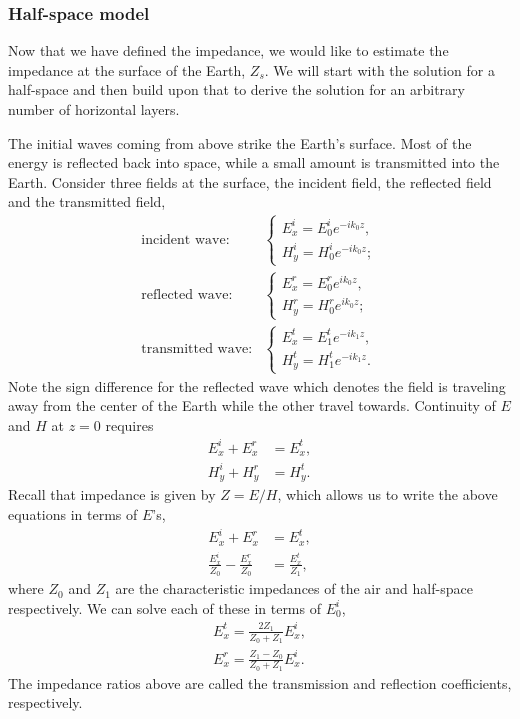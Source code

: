 \subsubsection{Half-space model}
Now that we have defined the impedance, we would like to estimate the impedance
at the surface of the Earth, $Z_s$.  We will start with the solution for a
half-space and then build upon that to derive the solution for an arbitrary
number of horizontal layers.

The initial waves coming from above strike the Earth's surface.  Most of the
energy is reflected back into space, while a small amount is transmitted into
the Earth.  Consider three fields at the surface, the incident field, the
reflected field and the transmitted field,
\begin{align}
    \text{incident wave:} &
    \begin{cases}
        E^i_x = E^i_0 e^{-i k_0 z}, \\
        H^i_y = H^i_0 e^{-i k_0 z};
    \end{cases} \\
    \text{reflected wave:} &
    \begin{cases}
        E^r_x = E^r_0 e^{i k_0 z}, \\
        H^r_y = H^r_0 e^{i k_0 z};
    \end{cases} \\
    \text{transmitted wave:} &
    \begin{cases}
        E^t_x = E^t_1 e^{-i k_1 z}, \\
        H^t_y = H^t_1 e^{-i k_1 z}.
    \end{cases}
    \label{eq-sfield}
\end{align}
Note the sign difference for the reflected wave which denotes the field is
traveling away from the center of the Earth while the other travel towards.
Continuity of $E$ and $H$ at $z = 0$ requires
\begin{align*}
    E^i_x + E^r_x & = E^t_x, \\
    H^i_y + H^r_y & = H^t_y.
\end{align*}
Recall that impedance is given by $Z = E/H$, which allows us to write
the above equations in terms of $E$'s,
\begin{align*}
    E^i_x + E^r_x & = E^t_x, \\
    \frac{E^i_x}{Z_0} - \frac{E^r_x}{Z_0} & = \frac{E^t_x}{Z_1},
\end{align*}
where $Z_0$ and $Z_1$ are the characteristic impedances of the air and
half-space respectively.  We can solve each of these in terms of $E^i_0$,
\begin{align*}
    E^t_x = \frac{2 Z_1}{Z_0 + Z_1} E^i_x, \\
    E^r_x = \frac{Z_1 - Z_0}{Z_0 + Z_1} E^i_x.
\end{align*}
The impedance ratios above are called the transmission and reflection
coefficients, respectively.

